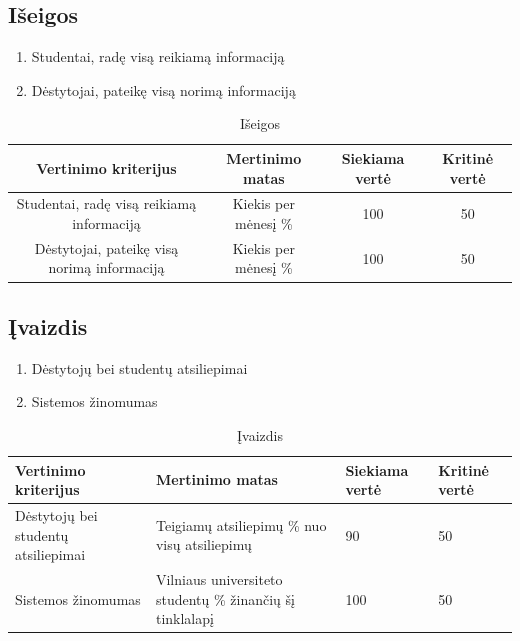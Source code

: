 \documentclass{VUMIFPSkursinis}
\begin{document}
\subsection{Išeigos}
\begin{enumerate}
	\item Studentai, radę visą reikiamą informaciją
	\item Dėstytojai, pateikę visą norimą informaciją
\end{enumerate}
\begin{table}[H]
	\centering
	\caption{Išeigos}
	{\begin{tabular}{|c|c|c|c|} \hline
			Vertinimo kriterijus & Mertinimo matas & Siekiama vertė & Kritinė vertė \\
			\hline
			Studentai, radę visą reikiamą informaciją & Kiekis per mėnesį \% & 100 & 50 \\
			\hline
			Dėstytojai, pateikę visą norimą informaciją & Kiekis per mėnesį \% & 100 & 50 \\
			\hline
	\end{tabular}}
	\label{iseigos}
\end{table}
	\subsection{Įvaizdis}
\begin{enumerate}
	\item Dėstytojų bei studentų atsiliepimai
	\item Sistemos žinomumas
\end{enumerate}
\begin{table}[H]
	\centering
	\caption{Įvaizdis}
	{\begin{tabular}{|p{5cm}|p{}|p{2cm}|p{2cm}|}\hline
			Vertinimo kriterijus & Mertinimo matas & Siekiama vertė & Kritinė vertė \\
			\hline
			Dėstytojų bei studentų atsiliepimai & Teigiamų atsiliepimų \% nuo visų atsiliepimų & 90 & 50 \\
			\hline
			Sistemos žinomumas & Vilniaus universiteto studentų \% žinančių šį tinklalapį & 100 & 50 \\
			\hline
	\end{tabular}}
	\label{ivaizdis}
\end{table}
\end{document}

